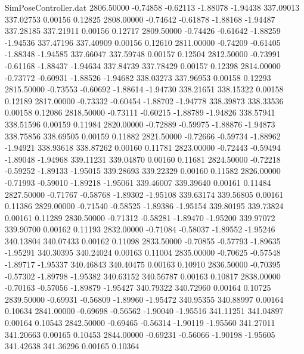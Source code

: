 \begin{filecontents}{SimPoseController.dat}
2806.50000   -0.74858   -0.62113    -1.88078   -1.94438  337.09013  337.02753    0.00156    0.12825
2808.00000   -0.74642   -0.61878    -1.88168   -1.94487  337.28185  337.21911    0.00156    0.12717
2809.50000   -0.74426   -0.61642    -1.88259   -1.94536  337.47196  337.40909    0.00156    0.12610
2811.00000   -0.74209   -0.61405    -1.88348   -1.94585  337.66047  337.59748    0.00157    0.12504
2812.50000   -0.73991   -0.61168    -1.88437   -1.94634  337.84739  337.78429    0.00157    0.12398
2814.00000   -0.73772   -0.60931    -1.88526   -1.94682  338.03273  337.96953    0.00158    0.12293
2815.50000   -0.73553   -0.60692    -1.88614   -1.94730  338.21651  338.15322    0.00158    0.12189
2817.00000   -0.73332   -0.60454    -1.88702   -1.94778  338.39873  338.33536    0.00158    0.12086
2818.50000   -0.73111   -0.60215    -1.88789   -1.94826  338.57941  338.51596    0.00159    0.11984
2820.00000   -0.72889   -0.59975    -1.88876   -1.94873  338.75856  338.69505    0.00159    0.11882
2821.50000   -0.72666   -0.59734    -1.88962   -1.94921  338.93618  338.87262    0.00160    0.11781
2823.00000   -0.72443   -0.59494    -1.89048   -1.94968  339.11231  339.04870    0.00160    0.11681
2824.50000   -0.72218   -0.59252    -1.89133   -1.95015  339.28693  339.22329    0.00160    0.11582
2826.00000   -0.71993   -0.59010    -1.89218   -1.95061  339.46007  339.39640    0.00161    0.11484
2827.50000   -0.71767   -0.58768    -1.89302   -1.95108  339.63174  339.56805    0.00161    0.11386
2829.00000   -0.71540   -0.58525    -1.89386   -1.95154  339.80195  339.73824    0.00161    0.11289
2830.50000   -0.71312   -0.58281    -1.89470   -1.95200  339.97072  339.90700    0.00162    0.11193
2832.00000   -0.71084   -0.58037    -1.89552   -1.95246  340.13804  340.07433    0.00162    0.11098
2833.50000   -0.70855   -0.57793    -1.89635   -1.95291  340.30395  340.24024    0.00163    0.11004
2835.00000   -0.70625   -0.57548    -1.89717   -1.95337  340.46843  340.40475    0.00163    0.10910
2836.50000   -0.70395   -0.57302    -1.89798   -1.95382  340.63152  340.56787    0.00163    0.10817
2838.00000   -0.70163   -0.57056    -1.89879   -1.95427  340.79322  340.72960    0.00164    0.10725
2839.50000   -0.69931   -0.56809    -1.89960   -1.95472  340.95355  340.88997    0.00164    0.10634
2841.00000   -0.69698   -0.56562    -1.90040   -1.95516  341.11251  341.04897    0.00164    0.10543
2842.50000   -0.69465   -0.56314    -1.90119   -1.95560  341.27011  341.20663    0.00165    0.10453
2844.00000   -0.69231   -0.56066    -1.90198   -1.95605  341.42638  341.36296    0.00165    0.10364

\end{filecontents}
